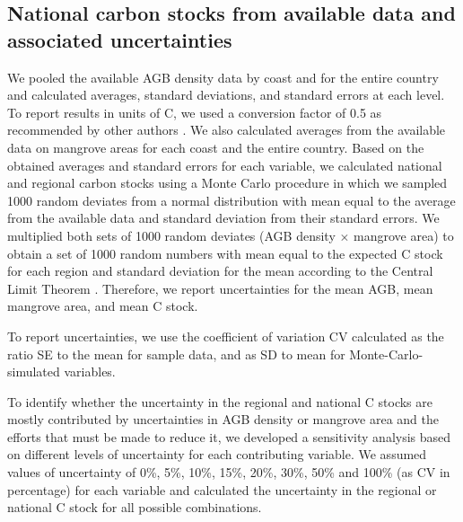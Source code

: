 \documentclass[review, authoryear]{elsarticle}   	%
\begin{document}
\subsection{National carbon stocks from available data and associated uncertainties}
We pooled the available AGB density data by coast and for the entire country and calculated averages, standard deviations, and standard errors at each level. To report results in units of C, we used a conversion factor of 0.5 as recommended by other authors \citep{MacDicken1997, Clark2001, Fearnside2004, Chave2005, Aragao2009}. We also calculated averages from the available data on mangrove areas for each coast and the entire country. Based on the obtained averages and standard errors for each variable, we calculated national and regional carbon stocks using a Monte Carlo procedure in which we sampled 1000 random deviates from a normal distribution with mean equal to the average from the available data and standard deviation from their standard errors. We multiplied both sets of 1000 random deviates (AGB density $\times$ mangrove area) to obtain a set of 1000 random numbers with mean equal to the expected C stock for each region and standard deviation for the mean according to the Central Limit Theorem \citep[see also][]{Sierra2007}. Therefore, we report uncertainties for the mean AGB, mean mangrove area, and mean C stock.

To report uncertainties, we use the coefficient of variation CV calculated as the ratio SE to the mean for sample data, and as SD to mean for Monte-Carlo-simulated variables.

To identify whether the uncertainty in the regional and national C stocks are mostly contributed by uncertainties in AGB density or mangrove area and the efforts that must be made to reduce it, we developed a sensitivity analysis based on different levels of uncertainty for each contributing variable. We assumed values of uncertainty of 0\%, 5\%, 10\%, 15\%, 20\%, 30\%, 50\% and 100\% (as CV in percentage) for each variable and calculated the uncertainty in the regional or national C stock for all possible combinations.

\end{document}
